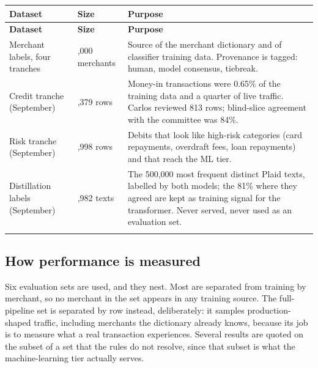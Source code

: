 {\small
\setlength{\TableWidth}{\dimexpr\linewidth-6\tabcolsep\relax}
\begin{longtable}{>{\raggedright\arraybackslash}p{0.29\TableWidth}>{\raggedright\arraybackslash}p{0.26\TableWidth}>{\raggedright\arraybackslash}p{0.45\TableWidth}}
\rowcolor{BlueTint}
\bfseries Dataset & \bfseries Size & \bfseries Purpose \\ \midrule
\endfirsthead
\rowcolor{BlueTint}
\bfseries Dataset & \bfseries Size & \bfseries Purpose \\ \midrule
\endhead
Merchant labels, four tranches & 100,000 merchants & Source of the merchant dictionary and of classifier training data. Provenance is tagged: human, model consensus, tiebreak. \\ \addlinespace[4pt]
Credit tranche (September) & 30,379 rows & Money-in transactions were 0.65\% of the training data and a quarter of live traffic. Carlos reviewed 813 rows; blind-slice agreement with the committee was 84\%. \\ \addlinespace[4pt]
Risk tranche (September) & 4,998 rows & Debits that look like high-risk categories (card repayments, overdraft fees, loan repayments) and that reach the ML tier. \\ \addlinespace[4pt]
Distillation labels (September) & 404,982 texts & The 500,000 most frequent distinct Plaid texts, labelled by both models; the 81\% where they agreed are kept as training signal for the transformer. Never served, never used as an evaluation set. \\ \addlinespace[4pt]
\bottomrule
\end{longtable}}
\subsection{How performance is measured}
Six evaluation sets are used, and they nest. Most are separated from training by merchant, so no merchant in the set appears in any training source. The full-pipeline set is separated by row instead, deliberately: it samples production-shaped traffic, including merchants the dictionary already knows, because its job is to measure what a real transaction experiences. Several results are quoted on the subset of a set that the rules do not resolve, since that subset is what the machine-learning tier actually serves.


